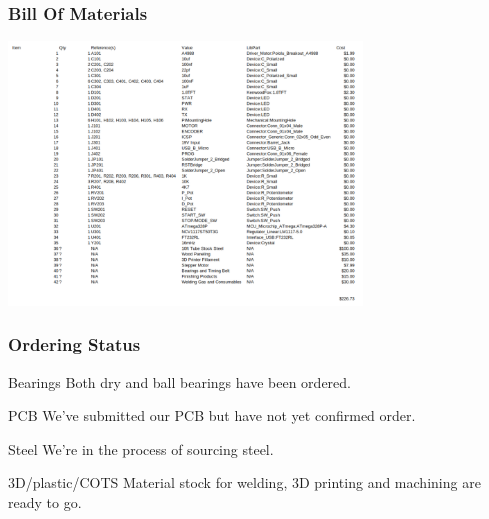 \documentclass[aspectratio=169]{beamer}
\begin{document}
\begin{frame}
    \frametitle{Bill Of Materials}

    \includegraphics[height=7cm]{BOMTable}

\end{frame}

\begin{frame}
    \frametitle{Ordering Status}

    \begin{block}{Bearings}
        Both dry and ball bearings have been ordered.
    \end{block}

    \begin{block}{PCB}
        We've submitted our PCB but have not yet confirmed order.
    \end{block}

    \begin{block}{Steel}
        We're in the process of sourcing steel.
    \end{block}

    \begin{block}{3D/plastic/COTS}
        Material stock for welding, 3D printing and machining are ready to go.
    \end{block}
\end{frame}
\end{document}
